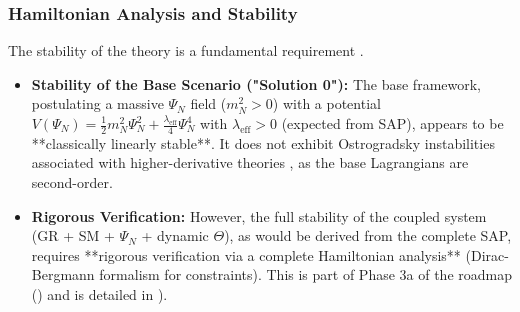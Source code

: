 \documentclass[11pt, a4paper]{article}
\theoremstyle{remark}
\begin{document}
\subsubsection{Hamiltonian Analysis and Stability}
\label{sec:analisis_estabilidad_final}
The stability of the theory is a fundamental requirement \citep{HenneauxTeitelboim1992}.
\begin{itemize}
    \item \textbf{Stability of the Base Scenario ("Solution 0"):} The base framework, postulating a massive \( \Psi_N \) field (\( m_N^2 > 0 \)) with a potential \( V(\Psi_N) = \frac{1}{2}m_N^2 \Psi_N^2 + \frac{\lambda_{\text{eff}}}{4}\Psi_N^4 \) with \( \lambda_{\text{eff}} > 0 \) (expected from SAP), appears to be **classically linearly stable**. It does not exhibit Ostrogradsky instabilities associated with higher-derivative theories \citep{OstrogradskiRef, Woodard:2014wia}, as the base Lagrangians are second-order.
    \item \textbf{Rigorous Verification:} However, the full stability of the coupled system (GR + SM + \( \Psi_N \) + dynamic \( \Theta \)), as would be derived from the complete SAP, requires **rigorous verification via a complete Hamiltonian analysis** (Dirac-Bergmann formalism for constraints). This is part of Phase 3a of the roadmap () and is detailed in ).
\end{itemize}
\end{document}
